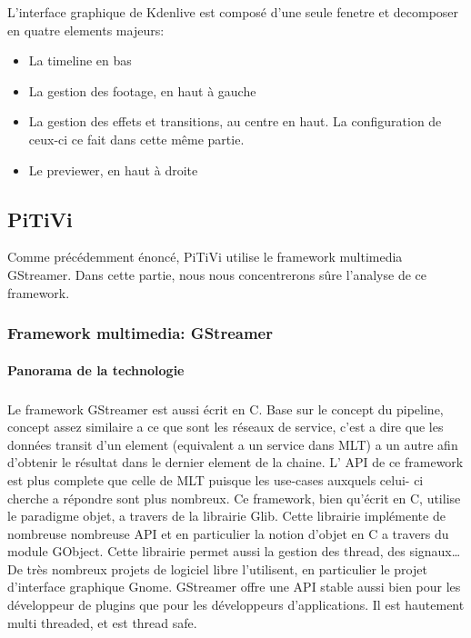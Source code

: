 L'interface graphique de Kdenlive est composé d'une seule fenetre et
decomposer en quatre elements majeurs:

\begin{itemize}

  \item {La timeline en bas}

  \item {La gestion des footage, en haut à gauche}

  \item {La gestion des effets et transitions, au centre en haut. La
  configuration de ceux-ci ce fait dans cette même partie.}

  \item {Le previewer, en haut à droite}

\end{itemize}

\subsection {PiTiVi}

Comme précédemment énoncé, PiTiVi utilise le framework multimedia
GStreamer. Dans cette partie, nous nous concentrerons sûre l'analyse
de ce framework.

\subsubsection {Framework multimedia: GStreamer}

\paragraph {Panorama de la technologie} %

\subparagraph{}

Le framework GStreamer est aussi écrit en C. Base sur le concept du
pipeline, concept assez similaire a ce que sont les réseaux de
service, c'est a dire que les données transit d'un element (equivalent
a un service dans MLT) a un autre afin d'obtenir le résultat dans le
dernier element de la chaine. L' API de ce framework est plus complete que celle de
MLT puisque les use-cases auxquels celui- ci cherche a répondre sont plus
nombreux. Ce framework, bien qu'écrit en C, utilise le paradigme objet,
a travers de la librairie Glib. Cette librairie implémente de nombreuse
nombreuse API et en particulier la notion d'objet en C a travers du
module GObject.  Cette librairie permet aussi la gestion des thread, des
signaux\ldots De très nombreux projets de logiciel libre l'utilisent,
en particulier le projet d'interface graphique Gnome. GStreamer offre
une API stable aussi bien pour les développeur de plugins que pour les
développeurs d'applications. Il est hautement multi threaded, et est
thread safe.

